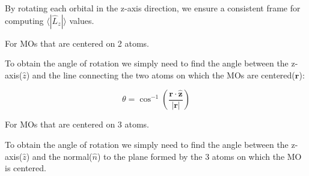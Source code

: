 \documentclass{article}
\begin{document}
\begin{itemize}
By rotating each orbital in the z-axis direction, we ensure a consistent frame for computing $\langle |\hat{L}_z| \rangle$ values.

\begin{tcolorbox}[colback=blue!5!white, colframe=brown!75!black, title=Important Note]
For MOs that are centered on 2 atoms.
\end{tcolorbox}

To obtain the angle of rotation we simply need to find the angle between the z-axis($\textbf{$\hat{z}$}$) and the line connecting the two atoms on which the MOs are centered($\textbf{r}$):

\[
\theta = \cos^{-1}\left( \frac{ \mathbf{r} \cdot \hat{\mathbf{z}} }{ \left| \mathbf{r} \right| } \right)
\]

\begin{tcolorbox}[colback=blue!5!white, colframe=brown!75!black, title=Important Note]
For MOs that are centered on 3 atoms.
\end{tcolorbox}

To obtain the angle of rotation we simply need to find the angle between the z-axis($\textbf{$\hat{z}$}$) and the normal($\textbf{$\hat{n}$}$) to the plane formed by the 3 atoms on which the MO is centered.

\begin{center}
\end{center}
\end{itemize}
\end{document}
